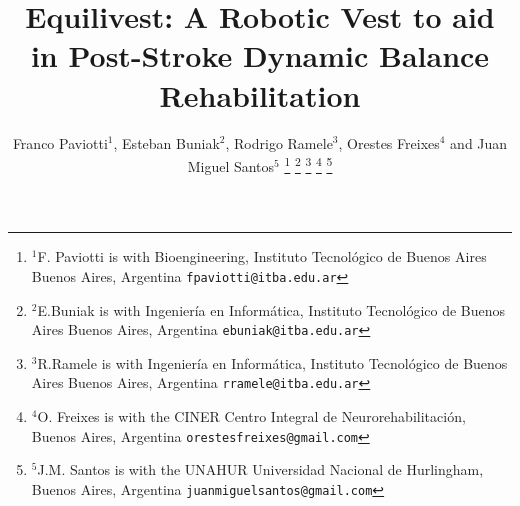 \documentclass[conference]{IEEEtran}
\begin{document}
\title{Equilivest: A Robotic Vest to aid in Post-Stroke Dynamic Balance Rehabilitation
}

\author{%
Franco Paviotti$^{1}$, Esteban Buniak$^{2}$, Rodrigo Ramele$^{3}$, Orestes Freixes$^{4}$ and Juan Miguel Santos$^{5}$%
\thanks{$^{1}$F. Paviotti is with Bioengineering, Instituto Tecnológico de Buenos Aires
                    Buenos Aires, Argentina
        {\tt\small fpaviotti@itba.edu.ar}}%
\thanks{$^{2}$E.Buniak is with Ingeniería en Informática, Instituto Tecnológico de Buenos Aires
                    Buenos Aires, Argentina
        {\tt\small ebuniak@itba.edu.ar}}%
\thanks{$^{3}$R.Ramele is with Ingeniería en Informática, Instituto Tecnológico de Buenos Aires
                    Buenos Aires, Argentina
        {\tt\small rramele@itba.edu.ar}}%
\thanks{$^{4}$O. Freixes is with the CINER Centro Integral de Neurorehabilitación,
                    Buenos Aires, Argentina
        {\tt\small orestesfreixes@gmail.com}}%
\thanks{$^{5}$J.M. Santos is with the UNAHUR Universidad Nacional de Hurlingham,
                    Buenos Aires, Argentina
        {\tt\small juanmiguelsantos@gmail.com}}%
}

\end{document}

